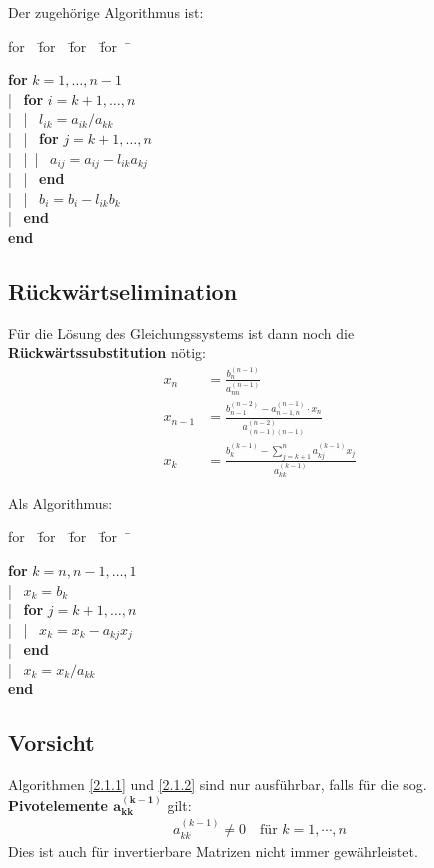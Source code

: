 \documentclass[ngerman,fontsize=11pt, paper=a4, parskip=half, titlepage=true, toc=bib]{scrbook}
\theoremstyle{definition}
\theoremstyle{plain}
\newcommand{\subsectione}[1]{\subsection{#1} \addtocounter{Def}{1}}
\newenvironment{pseudocode}[1]{ %
  \begin{minipage}{#1}
    \begin{framed}
      \hspace*{1em}	
      \begin{minipage}{#1}
        \begin{tabbing}
          for~~\= for~~\= for~~\= for~~\= \kill
	}
	{ %
        \end{tabbing}
      \end{minipage}
      \hspace*{1em}
    \end{framed}
  \end{minipage}
}
\begin{document}
Der zugehörige Algorithmus ist:

\begin{pseudocode}{0.5\linewidth}
  \textbf{for} $ k = 1, \dots , n-1$\\
  |~	\> \textbf{for} $i = k + 1, \dots , n$ \\
  |~	\> |~\> $l_{ik} = a_{ik} /a_{kk}$\\
  |~	\> |~\> \textbf{for} $j = k + 1, \dots , n$ \\
  |~	\> |~\>|~\> $a_{ij} = a_{ij} - l_{ik} a_{kj} $\\
  |~	\> |~\> \textbf{end}\\
  |~	\> |~\> $b_i = b_i -  l_{ik} b_k $\\
  |~	\> \textbf{end} \\
  \textbf{end}
\end{pseudocode}

\subsectione{Rückwärtselimination}\label{2.1.2}
Für die Lösung des Gleichungssystems ist dann noch die
 \textbf{Rückwärtssubstitution}  nötig:
\begin{align}
  x_n &= \frac{b_n^{(n-1)}}{a_{nn}^{(n-1)}} \label{II.1.5} \\
  x_{n-1} &=  \frac{b_{n-1}^{(n-2)}-a_{n-1,n}^{(n-1)}\cdot x_n}
  							 {a_{(n-1)(n-1)}^{(n-2)}} \label{II.1.6} \\
  x_k &= \frac{b_k^{(k-1)}-\sum_{j=k+1}^{n}a_{kj}^{(k-1)}x_j}
                     {a_{kk}^{(k-1)}} \label{II.1.7}
\end{align}

Als Algorithmus:

\begin{pseudocode}{0.5\linewidth}
  \textbf{for} $k = n, n -1, \dots , 1$ \\
  |~		\>$x_k = b_k$ \\
  |~		\>\textbf{for} $j = k + 1, \dots , n$ \\
  |~		\>|~	$x_k = x_k - a_{kj}x_j$ \\
  |~		\>\textbf{end} \\
  |~		\>$x_k = x_k /a_{kk}$ \\
  \textbf{end}
\end{pseudocode}

\subsectione{Vorsicht}
Algorithmen \ref{2.1.1} und \ref{2.1.2} sind nur ausführbar,
 falls für die sog. \textbf{Pivotelemente $\mathbf{a_{kk}^{(k-1)}}$ }  gilt:
\begin{gather*}
  a_{kk}^{(k-1)} \neq 0 \quad   \text{für } k=1, \cdots , n
\end{gather*}
Dies ist auch für invertierbare Matrizen nicht immer gewährleistet.
\end{document}
